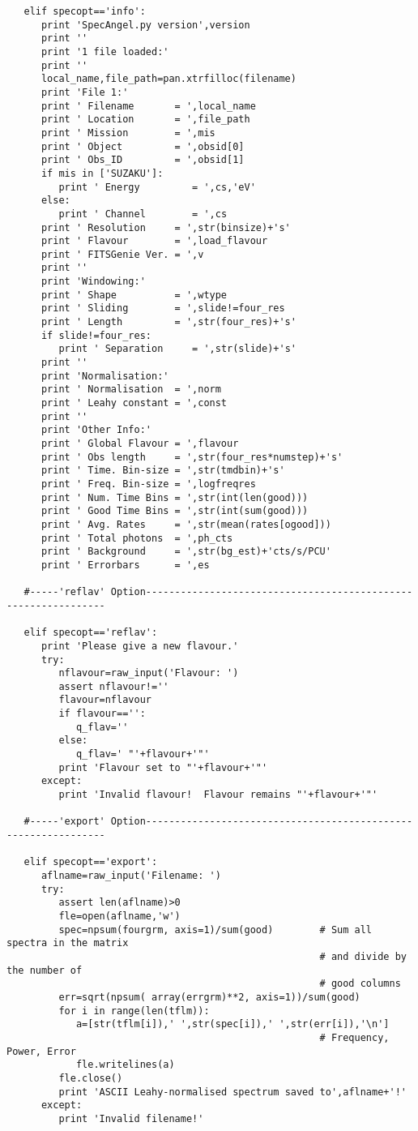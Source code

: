 \begin{verbatim}
   elif specopt=='info':
      print 'SpecAngel.py version',version
      print ''
      print '1 file loaded:'
      print ''
      local_name,file_path=pan.xtrfilloc(filename)
      print 'File 1:'
      print ' Filename       = ',local_name
      print ' Location       = ',file_path
      print ' Mission        = ',mis
      print ' Object         = ',obsid[0]
      print ' Obs_ID         = ',obsid[1]
      if mis in ['SUZAKU']:
         print ' Energy         = ',cs,'eV'
      else:
         print ' Channel        = ',cs
      print ' Resolution     = ',str(binsize)+'s'
      print ' Flavour        = ',load_flavour
      print ' FITSGenie Ver. = ',v
      print ''
      print 'Windowing:'
      print ' Shape          = ',wtype
      print ' Sliding        = ',slide!=four_res
      print ' Length         = ',str(four_res)+'s'
      if slide!=four_res:
         print ' Separation     = ',str(slide)+'s'
      print ''
      print 'Normalisation:'
      print ' Normalisation  = ',norm
      print ' Leahy constant = ',const
      print ''
      print 'Other Info:'
      print ' Global Flavour = ',flavour
      print ' Obs length     = ',str(four_res*numstep)+'s'
      print ' Time. Bin-size = ',str(tmdbin)+'s'
      print ' Freq. Bin-size = ',logfreqres
      print ' Num. Time Bins = ',str(int(len(good)))
      print ' Good Time Bins = ',str(int(sum(good)))
      print ' Avg. Rates     = ',str(mean(rates[ogood]))
      print ' Total photons  = ',ph_cts
      print ' Background     = ',str(bg_est)+'cts/s/PCU'
      print ' Errorbars      = ',es

   #-----'reflav' Option---------------------------------------------------------------

   elif specopt=='reflav':
      print 'Please give a new flavour.'
      try:
         nflavour=raw_input('Flavour: ')
         assert nflavour!=''
         flavour=nflavour
         if flavour=='':
            q_flav=''
         else:
            q_flav=' "'+flavour+'"'
         print 'Flavour set to "'+flavour+'"'
      except:
         print 'Invalid flavour!  Flavour remains "'+flavour+'"'

   #-----'export' Option---------------------------------------------------------------

   elif specopt=='export':
      aflname=raw_input('Filename: ')
      try:
         assert len(aflname)>0
         fle=open(aflname,'w')
         spec=npsum(fourgrm, axis=1)/sum(good)        # Sum all spectra in the matrix
                                                      # and divide by the number of
                                                      # good columns
         err=sqrt(npsum( array(errgrm)**2, axis=1))/sum(good)
         for i in range(len(tflm)):
            a=[str(tflm[i]),' ',str(spec[i]),' ',str(err[i]),'\n']
                                                      # Frequency, Power, Error
            fle.writelines(a)
         fle.close()
         print 'ASCII Leahy-normalised spectrum saved to',aflname+'!'
      except:
         print 'Invalid filename!'


\end{verbatim}
